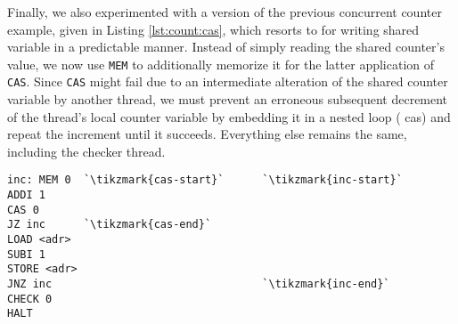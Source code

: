 Finally, we also experimented with a  version of the previous concurrent counter example, given in Listing \ref{lst:count:cas}, which resorts to  for writing  shared variable in a predictable manner.
Instead of simply reading the shared counter's value, we now use \lstinline[style=asm]{MEM} to additionally memorize it for the latter application of \lstinline[style=asm]{CAS}.
Since \lstinline[style=asm]{CAS} might fail due to an intermediate alteration of the shared counter variable by another thread, we must prevent an erroneous subsequent decrement of the thread's local counter variable by embedding it in a nested loop ( {\color{red!60!black}\textsf{cas}})
and repeat the increment until it succeeds. %
Everything else remains the same, including the checker thread.

\vfill

\begin{minipage}{\textwidth}
\begin{lstlisting}[style=asm, caption={\CHANGE{Valid} Counter Template}, label={lst:count:cas}, xleftmargin=0.39\textwidth]
inc: MEM 0  `\tikzmark{cas-start}`      `\tikzmark{inc-start}`
ADDI 1
CAS 0
JZ inc      `\tikzmark{cas-end}`
LOAD <adr>
SUBI 1
STORE <adr>
JNZ inc                                 `\tikzmark{inc-end}`
CHECK 0
HALT
\end{lstlisting}
\end{minipage}

